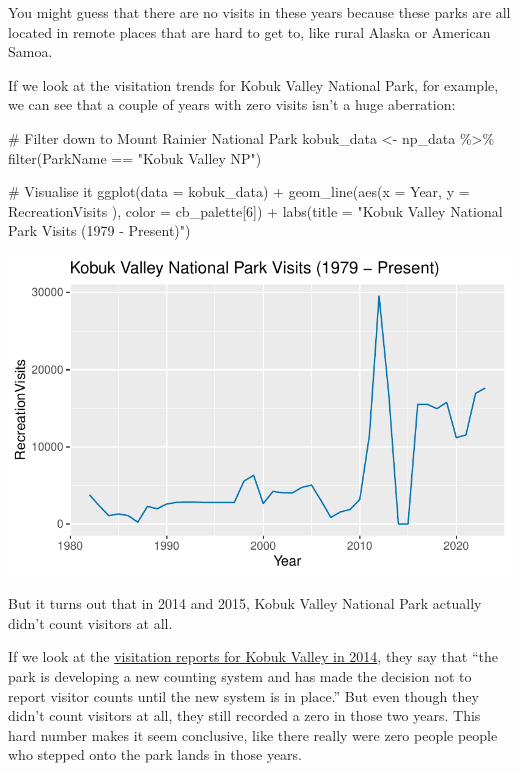 \documentclass[
  letterpaper,
  DIV=11,
  numbers=noendperiod]{scrartcl}
\newenvironment{Shaded}{\begin{snugshade}}{\end{snugshade}}
\newcommand{\AttributeTok}[1]{\textcolor[rgb]{0.40,0.45,0.13}{#1}}
\newcommand{\CommentTok}[1]{\textcolor[rgb]{0.37,0.37,0.37}{#1}}
\newcommand{\DecValTok}[1]{\textcolor[rgb]{0.68,0.00,0.00}{#1}}
\newcommand{\FunctionTok}[1]{\textcolor[rgb]{0.28,0.35,0.67}{#1}}
\newcommand{\NormalTok}[1]{\textcolor[rgb]{0.00,0.23,0.31}{#1}}
\newcommand{\OtherTok}[1]{\textcolor[rgb]{0.00,0.23,0.31}{#1}}
\newcommand{\SpecialCharTok}[1]{\textcolor[rgb]{0.37,0.37,0.37}{#1}}
\newcommand{\StringTok}[1]{\textcolor[rgb]{0.13,0.47,0.30}{#1}}
\begin{document}
You might guess that there are no visits in these years because these
parks are all located in remote places that are hard to get to, like
rural Alaska or American Samoa.

If we look at the visitation trends for Kobuk Valley National Park, for
example, we can see that a couple of years with zero visits isn't a huge
aberration:

\begin{Shaded}
\begin{Highlighting}[]
\CommentTok{\# Filter down to Mount Rainier National Park}
\NormalTok{kobuk\_data }\OtherTok{\textless{}{-}}\NormalTok{ np\_data }\SpecialCharTok{\%\textgreater{}\%} \FunctionTok{filter}\NormalTok{(ParkName }\SpecialCharTok{==} \StringTok{"Kobuk Valley NP"}\NormalTok{)}

\CommentTok{\# Visualise it}
\FunctionTok{ggplot}\NormalTok{(}\AttributeTok{data =}\NormalTok{ kobuk\_data) }\SpecialCharTok{+} 
  \FunctionTok{geom\_line}\NormalTok{(}\FunctionTok{aes}\NormalTok{(}\AttributeTok{x =}\NormalTok{ Year, }\AttributeTok{y =}\NormalTok{ RecreationVisits ), }\AttributeTok{color =}\NormalTok{ cb\_palette[}\DecValTok{6}\NormalTok{]) }\SpecialCharTok{+}
  \FunctionTok{labs}\NormalTok{(}\AttributeTok{title =} \StringTok{"Kobuk Valley National Park Visits (1979 {-} Present)"}\NormalTok{)}
\end{Highlighting}
\end{Shaded}

\includegraphics{with-tabs_files/figure-pdf/unnamed-chunk-5-1.pdf}

But it turns out that in 2014 and 2015, Kobuk Valley National Park
actually didn't count visitors at all.

If we look at the
\href{https://irma.nps.gov/Stats/SSRSReports/Park\%20Specific\%20Reports/Monthly\%20Visitation\%20Comments\%20By\%20Park?Park=KOVA}{visitation
reports for Kobuk Valley in 2014}, they say that ``the park is
developing a new counting system and has made the decision not to report
visitor counts until the new system is in place.'' But even though they
didn't count visitors at all, they still recorded a zero in those two
years. This hard number makes it seem conclusive, like there really were
zero people people who stepped onto the park lands in those years.
\end{document}
